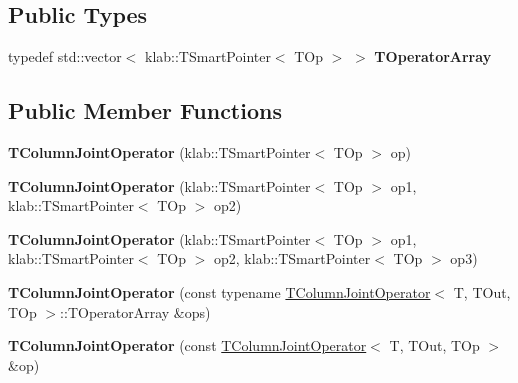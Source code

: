 \subsection*{Public Types}
\begin{DoxyCompactItemize}
\item 
typedef std\+::vector$<$ klab\+::\+T\+Smart\+Pointer$<$ T\+Op $>$ $>$ {\bfseries T\+Operator\+Array}\hypertarget{classkl1p_1_1TColumnJointOperator_a9d4fd1b1376b19a417cf13ed4fc422e2}{}\label{classkl1p_1_1TColumnJointOperator_a9d4fd1b1376b19a417cf13ed4fc422e2}

\end{DoxyCompactItemize}
\subsection*{Public Member Functions}
\begin{DoxyCompactItemize}
\item 
{\bfseries T\+Column\+Joint\+Operator} (klab\+::\+T\+Smart\+Pointer$<$ T\+Op $>$ op)\hypertarget{classkl1p_1_1TColumnJointOperator_a02082364d2d12a045519698ab5b9a241}{}\label{classkl1p_1_1TColumnJointOperator_a02082364d2d12a045519698ab5b9a241}

\item 
{\bfseries T\+Column\+Joint\+Operator} (klab\+::\+T\+Smart\+Pointer$<$ T\+Op $>$ op1, klab\+::\+T\+Smart\+Pointer$<$ T\+Op $>$ op2)\hypertarget{classkl1p_1_1TColumnJointOperator_ab97fc18b1c3c59df66865512d6839721}{}\label{classkl1p_1_1TColumnJointOperator_ab97fc18b1c3c59df66865512d6839721}

\item 
{\bfseries T\+Column\+Joint\+Operator} (klab\+::\+T\+Smart\+Pointer$<$ T\+Op $>$ op1, klab\+::\+T\+Smart\+Pointer$<$ T\+Op $>$ op2, klab\+::\+T\+Smart\+Pointer$<$ T\+Op $>$ op3)\hypertarget{classkl1p_1_1TColumnJointOperator_ab977246405a98933c73309eaa889df82}{}\label{classkl1p_1_1TColumnJointOperator_ab977246405a98933c73309eaa889df82}

\item 
{\bfseries T\+Column\+Joint\+Operator} (const typename \hyperlink{classkl1p_1_1TColumnJointOperator}{T\+Column\+Joint\+Operator}$<$ T, T\+Out, T\+Op $>$\+::T\+Operator\+Array \&ops)\hypertarget{classkl1p_1_1TColumnJointOperator_a4de54c20174cc3f935c446b5859fcaf8}{}\label{classkl1p_1_1TColumnJointOperator_a4de54c20174cc3f935c446b5859fcaf8}

\item 
{\bfseries T\+Column\+Joint\+Operator} (const \hyperlink{classkl1p_1_1TColumnJointOperator}{T\+Column\+Joint\+Operator}$<$ T, T\+Out, T\+Op $>$ \&op)\hypertarget{classkl1p_1_1TColumnJointOperator_a62e6479533163225e77c0e1b14378e0e}{}\label{classkl1p_1_1TColumnJointOperator_a62e6479533163225e77c0e1b14378e0e}


\end{DoxyCompactItemize}
